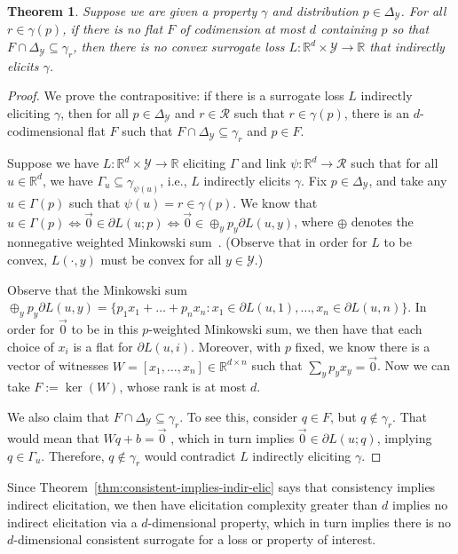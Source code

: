 \documentclass{article}
\newcommand{\reals}{\mathbb{R}}
\newcommand{\simplex}{\Delta_\Y}
\newcommand{\R}{\mathcal{R}}
\newcommand{\Y}{\mathcal{Y}}
\newtheorem{theorem}{Theorem}
\begin{document}
\begin{theorem}\label{thm:cvx-flats}
	Suppose we are given a property $\gamma$ and distribution $p \in \simplex$.
	For all $r\in\gamma(p)$, if there is no flat $F$ of codimension at most $d$ containing $p$ so that $F \cap \simplex \subseteq \gamma_r$, then there is no convex surrogate loss $L : \reals^d \times \Y \to \reals$ that indirectly elicits $\gamma$.
\end{theorem}
\begin{proof}[Proof]
	We prove the contrapositive: if there is a surrogate loss $L$ indirectly eliciting $\gamma$, then for all $p \in \simplex$ and $r \in \R$ such that $r \in \gamma(p)$, there is an $d$-codimensional flat $F$ such that $F \cap \simplex \subseteq \gamma_r$ and $p \in F$.
	
	Suppose we have $L:\reals^d \times \Y \to \reals$ eliciting $\Gamma$ and link $\psi : \reals^d \to \R$ such that for all $u \in \reals^d$, we have $\Gamma_u \subseteq \gamma_{\psi(u)}$, i.e., $L$ indirectly elicits $\gamma$.
	Fix $p \in \simplex$, and take any $u \in \Gamma(p)$ such that $\psi(u) = r \in \gamma(p)$.
	We know that $u \in \Gamma(p) \iff \vec 0 \in \partial L(u; p) \iff \vec 0 \in \oplus_y p_y \partial L(u,y)$, where $\oplus$ denotes the nonnegative weighted Minkowski sum~\cite[Theorem 4.1.1]{hiriart2012fundamentals}.  (Observe that in order for $L$ to be convex, $L(\cdot, y)$ must be convex for all $y \in \Y$.) 
	
	Observe that the Minkowski sum $\oplus_y p_y \partial L(u,y) = \{p_1 x_1 + \ldots + p_n x_n : x_1 \in \partial L(u,1), \ldots, x_n \in \partial L(u,n) \}$.
	In order for $\vec 0$ to be in this $p$-weighted Minkowski sum, we then have that each choice of $x_i$ is a flat for $\partial L(u, i)$.
	Moreover, with $p$ fixed, we know there is a vector of witnesses $W = [x_1, \ldots, x_n] \in \reals^{d\times n}$ such that $\sum_y p_y x_y = \vec 0$.
	Now we can take $F := \ker(W)$, whose rank is at most $d$.

	We also claim that $F \cap \simplex \subseteq \gamma_r$.
	To see this, consider $q \in F$, but $q \not \in \gamma_r$.
	That would mean that $Wq + b = \vec 0$ , which in turn implies $\vec 0 \in \partial L(u;q)$, implying $q \in \Gamma_u$.
	Therefore, $q \not \in \gamma_r$ would contradict $L$ indirectly eliciting $\gamma$.
\end{proof}

Since Theorem~\ref{thm:consistent-implies-indir-elic} says that consistency implies indirect elicitation, we then have elicitation complexity greater than $d$ implies no indirect elicitation via a $d$-dimensional property, which in turn implies there is no $d$-dimensional consistent surrogate for a loss or property of interest.
\end{document}
